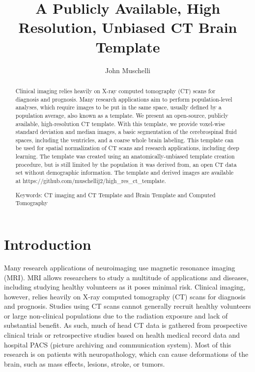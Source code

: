 \documentclass[]{elsarticle} %
\begin{document}
\begin{frontmatter}

  \title{A Publicly Available, High Resolution, Unbiased CT Brain Template}
    \author[JHSPH]{John Muschelli}
      \address[JHSPH]{Johns Hopkins Bloomberg School of Public Health, Department of Biostatistics, 615 N Wolfe St, Baltimore, MD, 21205}
    
  \begin{abstract}
  Clinical imaging relies heavily on X-ray computed tomography (CT) scans for diagnosis and prognosis. Many research applications aim to perform population-level analyses, which require images to be put in the same space, usually defined by a population average, also known as a template. We present an open-source, publicly available, high-resolution CT template. With this template, we provide voxel-wise standard deviation and median images, a basic segmentation of the cerebrospinal fluid spaces, including the ventricles, and a coarse whole brain labeling. This template can be used for spatial normalization of CT scans and research applications, including deep learning. The template was created using an anatomically-unbiased template creation procedure, but is still limited by the population it was derived from, an open CT data set without demographic information. The template and derived images are available at https://github.com/muschellij2/high\_res\_ct\_template.

  Keywords: CT imaging and CT Template and Brain Template and Computed Tomography
  \end{abstract}
  
 \end{frontmatter}

\hypertarget{introduction}{%
\section{Introduction}\label{introduction}}

Many research applications of neuroimaging use magnetic resonance imaging (MRI). MRI allows researchers to study a multitude of applications and diseases, including studying healthy volunteers as it poses minimal risk. Clinical imaging, however, relies heavily on X-ray computed tomography (CT) scans for diagnosis and prognosis. Studies using CT scans cannot generally recruit healthy volunteers or large non-clinical populations due to the radiation exposure and lack of substantial benefit. As such, much of head CT data is gathered from prospective clinical trials or retrospective studies based on health medical record data and hospital PACS (picture archiving and communication system). Most of this research is on patients with neuropathology, which can cause deformations of the brain, such as mass effects, lesions, stroke, or tumors.
\end{document}
